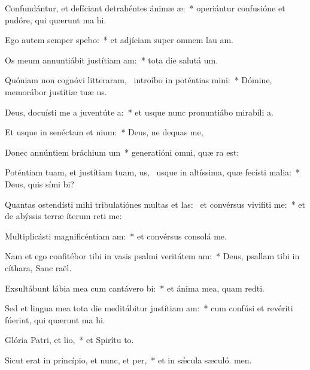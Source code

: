 \item Confundántur, et defíciant detrahéntes ánimæ æ:~* operiántur confusióne et pudóre, qui quærunt ma hi.
\item Ego autem semper spebo:~* et adjíciam super omnem lau am.
\item Os meum annuntiábit justítiam am:~* tota die salutá um.
\item Quóniam non cognóvi litteraram,~\pscross{} introíbo in poténtias mini:~* Dómine, memorábor justítiæ tuæ us.
\item Deus, docuísti me a juventúte a:~* et usque nunc pronuntiábo mirabíli a.
\item Et usque in senéctam et nium:~* Deus, ne dequas me,
\item Donec annúntiem bráchium um~* generatióni omni, quæ ra est:
\item Poténtiam tuam, et justítiam tuam, us,~\pscross{} usque in altíssima, quæ fecísti malia:~* Deus, quis sími bi?
\item Quantas ostendísti mihi tribulatiónes multas et las:~\pscross{} et convérsus vivifiti me:~* et de abýssis terræ íterum reti me:
\item Multiplicásti magnificéntiam am:~* et convérsus consolá  me.
\item Nam et ego confitébor tibi in vasis psalmi veritátem am:~* Deus, psallam tibi in cíthara, Sanc raël.
\item Exsultábunt lábia mea cum cantávero bi:~* et ánima mea, quam redti.
\item Sed et lingua mea tota die meditábitur justítiam am:~* cum confúsi et revériti fúerint, qui quærunt ma hi.
\item Glória Patri, et lio,~* et Spirítu to.
\item Sicut erat in princípio, et nunc, et per,~* et in sǽcula sæculó. men.
